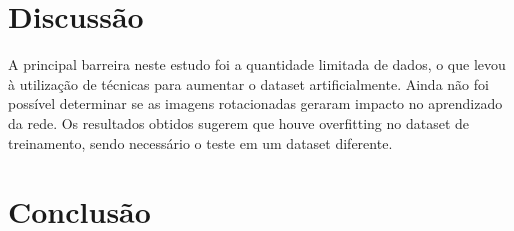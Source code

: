 \documentclass[conference]{IEEEtran}
\begin{document}


\section{Discussão}



A principal barreira neste estudo foi a quantidade limitada de dados, o que levou à utilização de técnicas para aumentar o dataset artificialmente. Ainda não foi possível determinar se as imagens rotacionadas geraram impacto no aprendizado da rede. Os resultados obtidos sugerem que houve overfitting no dataset de treinamento, sendo necessário o teste em um dataset diferente. %

\section{Conclusão}





\end{document}
